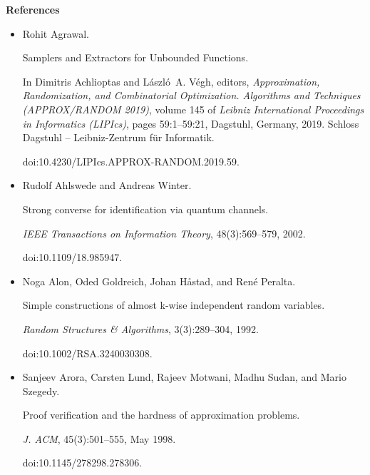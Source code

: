 \par\medskip\noindent\textbf{References}\par



\begin{itemize}


\item[] 
[1]

Rohit Agrawal.


Samplers and Extractors for Unbounded Functions.


In Dimitris Achlioptas and László A. Végh, editors, \emph{Approximation, Randomization, and Combinatorial Optimization. Algorithms and
Techniques (APPROX/RANDOM 2019)}, volume 145 of \emph{Leibniz International
Proceedings in Informatics (LIPIcs)}, pages 59:1–59:21, Dagstuhl, Germany,
2019. Schloss Dagstuhl – Leibniz-Zentrum für Informatik.


doi:10.4230/LIPIcs.APPROX-RANDOM.2019.59.





\item[] 
[2]

Rudolf Ahlswede and Andreas Winter.


Strong converse for identification via quantum channels.


\emph{IEEE Transactions on Information Theory}, 48(3):569–579, 2002.


doi:10.1109/18.985947.





\item[] 
[3]

Noga Alon, Oded Goldreich, Johan Håstad, and René Peralta.


Simple constructions of almost k-wise independent random variables.


\emph{Random Structures \& Algorithms}, 3(3):289–304, 1992.


doi:10.1002/RSA.3240030308.





\item[] 
[4]

Sanjeev Arora, Carsten Lund, Rajeev Motwani, Madhu Sudan, and Mario Szegedy.


Proof verification and the hardness of approximation problems.


\emph{J. ACM}, 45(3):501–555, May 1998.


doi:10.1145/278298.278306.






\end{itemize}
